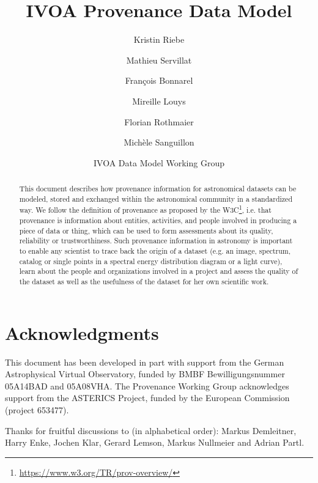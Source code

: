 \documentclass[11pt,a4paper]{ivoa}
\author{Kristin Riebe}
\author{Mathieu Servillat}
\author{François Bonnarel}
\author{Mireille Louys}
\author{Florian Rothmaier}
\author{Michèle Sanguillon}
\author{IVOA Data Model Working Group}
\begin{document}

\lstset{escapechar=@,style=customc}


\title{IVOA Provenance Data Model}

\begin{abstract}
This document describes how provenance information for astronomical datasets 
can be modeled, stored and exchanged within 
the astronomical community in a standardized way.
We follow the definition of provenance as proposed by the W3C\footnote{\url{https://www.w3.org/TR/prov-overview/}}, i.e. that provenance is information about entities, activities, and people involved in producing a piece of data or thing, which can be used to form assessments about its quality, reliability or trustworthiness.
Such provenance information in astronomy is important to enable any scientist to trace back
the origin of a dataset (e.g. an image, spectrum, catalog or single points in a 
spectral energy distribution diagram or a light curve), learn about the people and 
organizations involved in a project and assess the quality of the dataset as well
as the usefulness of the dataset for her own scientific work.
\end{abstract}


\section*{Acknowledgments}

This document has been developed in part with support from the German
Astrophysical Virtual Observatory, funded by BMBF Bewilligungsnummer 05A14BAD and 05A08VHA.
The Provenance Working Group acknowledges support from the ASTERICS Project, funded by the European Commission (project 653477).

Thanks for fruitful discussions to (in alphabetical order):
Markus Demleitner, Harry Enke, Jochen Klar, Gerard Lemson, Markus Nullmeier
and Adrian Partl.
\end{document}

